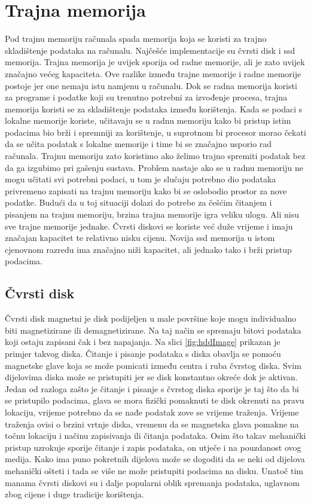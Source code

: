\documentclass[times, utf8, zavrsni, square]{fer}
\begin{document}
\section{Trajna memorija}
Pod trajnu memoriju računala spada memorija koja se koristi za trajno skladištenje podataka na računalu.
Najčešće implementacije su čvrsti disk i ssd memorija.
Trajna memorija je uvijek sporija od radne memorije, ali je zato uvijek značajno većeg kapaciteta.
Ove razlike između trajne memorije i radne memorije postoje jer one nemaju istu namjenu u računalu. 
Dok se radna memorija koristi za programe i podatke koji su trenutno potrebni za izvođenje procesa, trajna memorija koristi se za skladištenje podataka između korištenja.
Kada se podaci s lokalne memorije koriste, učitavaju se u radnu memoriju kako bi pristup istim podacima bio brži i spremniji za korištenje, 
u suprotnom bi procesor morao čekati da se učita podatak s lokalne memorije i time bi se značajno usporio rad računala.
Trajnu memoriju zato koristimo ako želimo trajno spremiti podatak bez da ga izgubimo pri gašenju sustava.
Problem nastaje ako se u radnu memoriju ne mogu učitati svi potrebni podaci, u tom je slučaju potrebno dio podataka privremeno zapisati na trajnu memoriju kako bi se oslobodio prostor za nove podatke.
Budući da u toj situaciji dolazi do potrebe za češćim čitanjem i pisanjem na trajnu memoriju, brzina trajna memorije igra veliku ulogu. 
Ali nisu sve trajne memorije jednake. Čvrsti diskovi se koriste već duže vrijeme i imaju značajan kapacitet te relativno nisku  cijenu.
Novija ssd memorija u istom cjenovnom razredu ima značajno niži kapacitet, ali jednako tako i brži pristup podacima.
\subsection{Čvrsti disk}
Čvrsti disk\cite{hdd} magnetni je disk podijeljen u male površine koje mogu individualno biti magnetizirane ili demagnetizirane.
Na taj način se spremaju bitovi podataka koji ostaju zapisani čak i bez napajanja.
Na slici \ref{fig:hddImage} prikazan je primjer takvog diska.
Čitanje i pisanje podataka s diska obavlja se pomoću magnetske glave koja se može pomicati između centra i ruba čvrstog diska.
Svim dijelovima diska može se pristupiti jer se disk konstantno okreće dok je aktivan.
Jedan od razloga zašto je čitanje i pisanje s čvrstog diska sporije je taj što da bi se pristupilo podacima, 
glava se mora fizički pomaknuti te disk okrenuti na pravu lokaciju, vrijeme potrebno da se nađe podatak zove se vrijeme traženja.
Vrijeme traženja ovisi o brzini vrtnje diska, vremenu da se magnetska glava pomakne na točnu lokaciju i načinu zapisivanja ili čitanja podataka\cite{hdd2}.
Osim što takav mehanički pristup uzrokuje sporije čitanje i zapis podataka, on utječe i na pouzdanost ovog medija.
Kako ima puno pokretnih dijelova može se dogoditi da se neki od dijelova mehanički ošteti i tada se više ne može pristupiti podacima na disku.
Unatoč tim manama čvrsti diskovi su i dalje popularni oblik spremanja podataka, uglavnom zbog cijene i duge tradicije korištenja.
\end{document}

